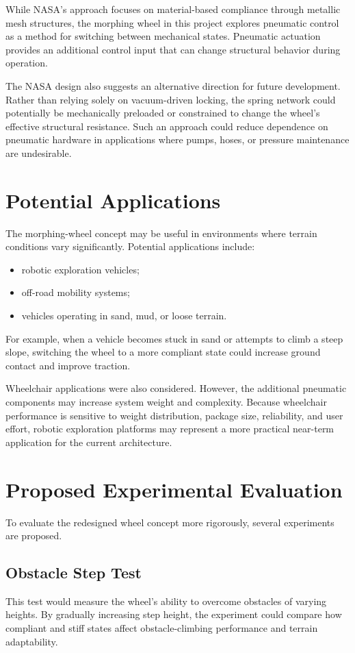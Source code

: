 \documentclass[11pt]{article}
\begin{document}
While NASA's approach focuses on material-based compliance through metallic mesh structures, the morphing wheel in this project explores pneumatic control as a method for switching between mechanical states. Pneumatic actuation provides an additional control input that can change structural behavior during operation.

The NASA design also suggests an alternative direction for future development. Rather than relying solely on vacuum-driven locking, the spring network could potentially be mechanically preloaded or constrained to change the wheel's effective structural resistance. Such an approach could reduce dependence on pneumatic hardware in applications where pumps, hoses, or pressure maintenance are undesirable.

\section{Potential Applications}
The morphing-wheel concept may be useful in environments where terrain conditions vary significantly. Potential applications include:
\begin{itemize}
  \item robotic exploration vehicles;
  \item off-road mobility systems;
  \item vehicles operating in sand, mud, or loose terrain.
\end{itemize}

For example, when a vehicle becomes stuck in sand or attempts to climb a steep slope, switching the wheel to a more compliant state could increase ground contact and improve traction.

Wheelchair applications were also considered. However, the additional pneumatic components may increase system weight and complexity. Because wheelchair performance is sensitive to weight distribution, package size, reliability, and user effort, robotic exploration platforms may represent a more practical near-term application for the current architecture.

\section{Proposed Experimental Evaluation}
To evaluate the redesigned wheel concept more rigorously, several experiments are proposed.

\subsection*{Obstacle Step Test}
This test would measure the wheel's ability to overcome obstacles of varying heights. By gradually increasing step height, the experiment could compare how compliant and stiff states affect obstacle-climbing performance and terrain adaptability.
\end{document}

